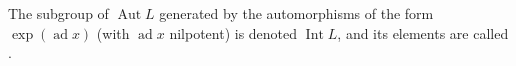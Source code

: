 The subgroup of $\operatorname{Aut} L$ generated by the automorphisms of the form $\exp(\operatorname{ad} x)$ (with $\operatorname{ad} x$ nilpotent) is denoted $\operatorname{Int} L$, and its elements are called .
